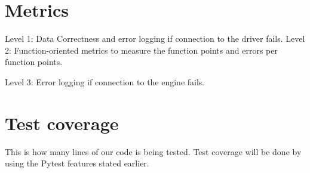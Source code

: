 \documentclass[letterpaper,12pt,oneside,listof=totoc]{scrreprt}
\begin{document}
\section{Metrics}

Level 1: Data Correctness and error logging if connection to the driver fails.
Level 2: Function-oriented metrics to measure the function points and errors per function points. 

Level 3: Error logging if connection to the engine fails.


\section{Test coverage}

This is how many lines of our code is being tested. Test coverage will be done by using the Pytest features stated earlier.
\end{document}

